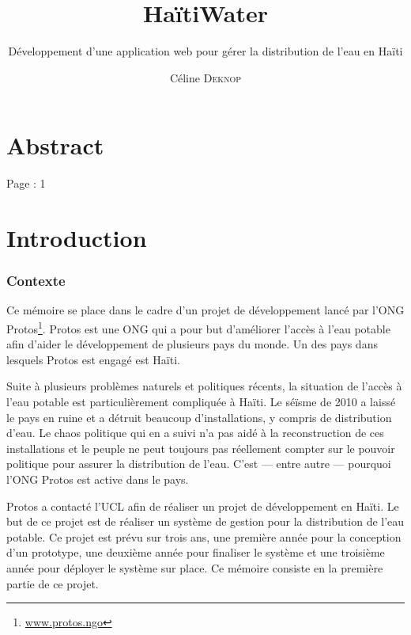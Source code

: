 \documentclass{eplmastersthesis_FR}
\title{HaïtiWater}
\subtitle{Développement d'une application web pour gérer la distribution de l'eau en Haïti}
\author{Céline \textsc{Deknop}}
\begin{document}
	\frontpage
	\tableofcontents

	\setlength{\parskip}{1.5em plus1em minus1em}


	\chapter*{Abstract}

		Page : 1

	\chapter{Introduction}


		\subsection*{Contexte}

			Ce mémoire se place dans le cadre d'un projet de développement lancé par l'ONG Protos\footnote{\href{https://www.protos.ngo/fr/}{www.protos.ngo}}. Protos est une ONG qui a pour but d'améliorer l'accès à l'eau potable afin d'aider le développement de plusieurs pays du monde. Un des pays dans lesquels Protos est engagé est Haïti.

			Suite à plusieurs problèmes naturels et politiques récents, la situation de l'accès à l'eau potable  est particulièrement compliquée à Haïti. Le séïsme de 2010 a laissé le pays en ruine et a détruit beaucoup d'installations, y compris de distribution d'eau. Le chaos politique qui en a suivi n'a pas aidé à la reconstruction de ces installations et le peuple ne peut toujours pas réellement compter sur le pouvoir politique pour assurer la distribution de l'eau. C'est --- entre autre --- pourquoi l'ONG Protos est active dans le pays.

			Protos a contacté l'UCL afin de réaliser un projet de développement en Haïti. Le but de ce projet est de réaliser un système de gestion pour la distribution de l'eau potable. Ce projet est prévu sur trois ans, une première année pour la conception d'un prototype, une deuxième année pour finaliser le système et une troisième année pour déployer le système sur place. Ce mémoire consiste en la première partie de ce projet.

\end{document}
